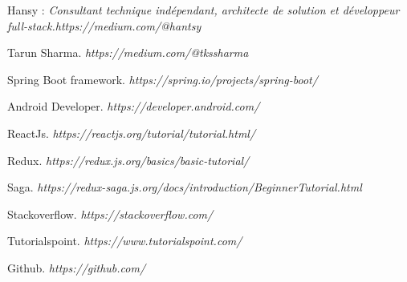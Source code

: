 %
\begin{thebibliography}{20}

Hansy : 
\textit{Consultant technique ind\'ependant, architecte de solution et d\'eveloppeur full-stack.\quad https://medium.com/@hantsy}

Tarun Sharma. 
\textit{https://medium.com/@tkssharma}

Spring Boot framework. 
\textit{https://spring.io/projects/spring-boot/}

Android Developer. 
\textit{https://developer.android.com/}

ReactJs. 
\textit{https://reactjs.org/tutorial/tutorial.html/}

Redux. 
\textit{https://redux.js.org/basics/basic-tutorial/}

Saga. 
\textit{https://redux-saga.js.org/docs/introduction/BeginnerTutorial.html}

 Stackoverflow. 
\textit{https://stackoverflow.com/}

 Tutorialspoint. 
\textit{https://www.tutorialspoint.com/}

 Github. 
\textit{https://github.com/}






\end{thebibliography}
